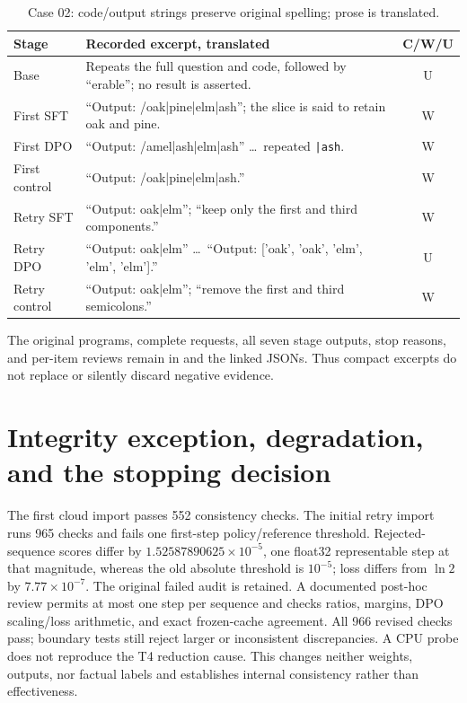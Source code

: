 \begin{table}[H]\centering\small
\caption{Case 02: code/output strings preserve original spelling; prose is translated.}\label{tab:training-case02}
\begin{tabularx}{\linewidth}{@{}lYc@{}}\toprule
Stage & Recorded excerpt, translated & C/W/U\\\midrule
Base & Repeats the full question and code, followed by ``erable''; no result is asserted. & U\\
First SFT & ``Output: /oak|pine|elm|ash''; the slice is said to retain oak and pine. & W\\
First DPO & ``Output: /amel|ash|elm|ash'' \ldots\ repeated \texttt{|ash}. & W\\
First control & ``Output: /oak|pine|elm|ash.'' & W\\
Retry SFT & ``Output: oak|elm''; ``keep only the first and third components.'' & W\\
Retry DPO & ``Output: oak|elm'' \ldots\ ``Output: ['oak', 'oak', 'elm', 'elm', 'elm'].'' & U\\
Retry control & ``Output: oak|elm''; ``remove the first and third semicolons.'' & W\\\bottomrule
\end{tabularx}
\end{table}\FloatBarrier

The original programs, complete requests, all seven stage outputs, stop reasons, and per-item reviews remain in  and the linked JSONs. Thus compact excerpts do not replace or silently discard negative evidence.

\section{Integrity exception, degradation, and the stopping decision}
The first cloud import passes 552 consistency checks. The initial retry import runs 965 checks and fails one first-step policy/reference threshold. Rejected-sequence scores differ by $1.52587890625\times10^{-5}$, one float32 representable step at that magnitude, whereas the old absolute threshold is $10^{-5}$; loss differs from $\ln2$ by $7.77\times10^{-7}$. The original failed audit is retained. A documented post-hoc review permits at most one step per sequence and checks ratios, margins, DPO scaling/loss arithmetic, and exact frozen-cache agreement. All 966 revised checks pass; boundary tests still reject larger or inconsistent discrepancies. A CPU probe does not reproduce the T4 reduction cause. This changes neither weights, outputs, nor factual labels and establishes internal consistency rather than effectiveness.


